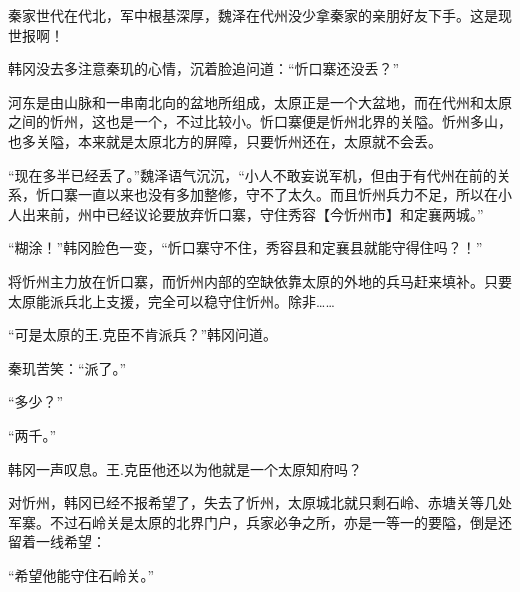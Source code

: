 秦家世代在代北，军中根基深厚，魏泽在代州没少拿秦家的亲朋好友下手。这是现世报啊！

韩冈没去多注意秦玑的心情，沉着脸追问道：“忻口寨还没丢？”

河东是由山脉和一串南北向的盆地所组成，太原正是一个大盆地，而在代州和太原之间的忻州，这也是一个，不过比较小。忻口寨便是忻州北界的关隘。忻州多山，也多关隘，本来就是太原北方的屏障，只要忻州还在，太原就不会丢。

“现在多半已经丢了。”魏泽语气沉沉，“小人不敢妄说军机，但由于有代州在前的关系，忻口寨一直以来也没有多加整修，守不了太久。而且忻州兵力不足，所以在小人出来前，州中已经议论要放弃忻口寨，守住秀容【今忻州市】和定襄两城。”

“糊涂！”韩冈脸色一变，“忻口寨守不住，秀容县和定襄县就能守得住吗？！”

将忻州主力放在忻口寨，而忻州内部的空缺依靠太原的外地的兵马赶来填补。只要太原能派兵北上支援，完全可以稳守住忻州。除非……

“可是太原的王.克臣不肯派兵？”韩冈问道。

秦玑苦笑：“派了。”

“多少？”

“两千。”

韩冈一声叹息。王.克臣他还以为他就是一个太原知府吗？

对忻州，韩冈已经不报希望了，失去了忻州，太原城北就只剩石岭、赤塘关等几处军寨。不过石岭关是太原的北界门户，兵家必争之所，亦是一等一的要隘，倒是还留着一线希望：

“希望他能守住石岭关。”
